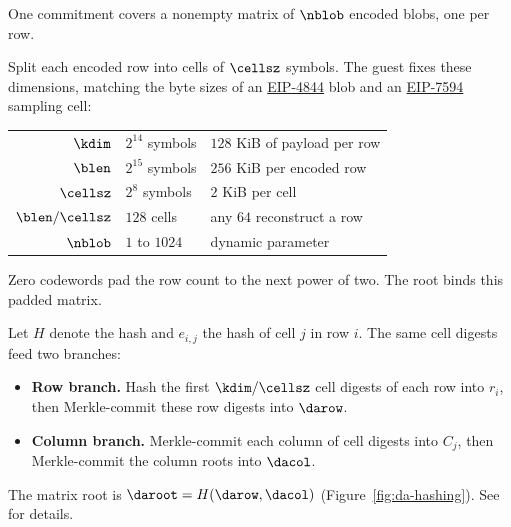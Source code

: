 One commitment covers a nonempty matrix of $\nblob$ encoded blobs, one per row.

Split each encoded row into cells of $\cellsz$ symbols. The guest fixes these dimensions, matching the byte sizes of an \href{https://eips.ethereum.org/EIPS/eip-4844}{EIP-4844} blob and an \href{https://eips.ethereum.org/EIPS/eip-7594}{EIP-7594} sampling cell:
\begin{center}
\begin{tabular}{@{}rll@{}}
\hline
$\kdim$ & $2^{14}$ symbols & $128$ KiB of payload per row\\
$\blen$ & $2^{15}$ symbols & $256$ KiB per encoded row\\
$\cellsz$ & $2^8$ symbols & $2$ KiB per cell\\
$\blen/\cellsz$ & $128$ cells & any $64$ reconstruct a row\\
$\nblob$ & $1$ to $1024$ & dynamic parameter\\
\hline
\end{tabular}
\end{center}
Zero codewords pad the row count to the next power of two. The root binds this padded matrix.

Let $H$ denote the hash and $e_{i,j}$ the hash of cell $j$ in row $i$. The same cell digests feed two branches:
\begin{itemize}[itemsep=1pt,topsep=3pt]
\item \textbf{Row branch.} Hash the first $\kdim/\cellsz$ cell digests of each row into $r_i$, then Merkle-commit these row digests into $\darow$.
\item \textbf{Column branch.} Merkle-commit each column of cell digests into $C_j$, then Merkle-commit the column roots into $\dacol$.
\end{itemize}
The matrix root is $\daroot=H(\darow,\dacol)$ (Figure~\ref{fig:da-hashing}). See \cite{LeanDA} for details.

